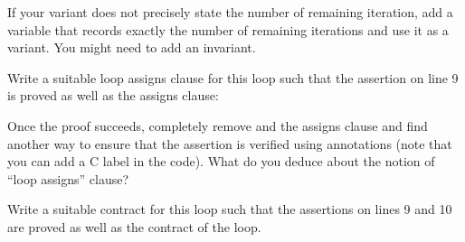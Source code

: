 If your variant does not precisely state the number of remaining
iteration, add a variable that records exactly the number of remaining
iterations and use it as a variant. You might need to add an invariant.





Write a suitable loop assigns clause for this loop such that the assertion
on line 9 is proved as well as the assigns clause:






Once the proof succeeds, completely remove and the assigns clause and find
another way to ensure that the assertion is verified using annotations (note
that you can add a C label in the code). What do you deduce about the notion
of ``loop assigns'' clause?





Write a suitable contract for this loop such that the assertions on lines
9 and 10 are proved as well as the contract of the loop.



